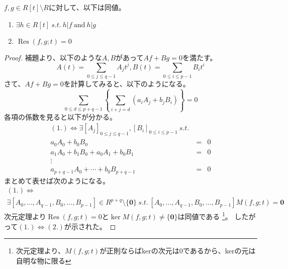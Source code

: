 \documentclass[a4]{article}
\newcommand{\Res}{\operatorname{Res}}
\begin{document}
        \begin{Them}
            $f,g \in R[t] \setminus R$に対して、以下は同値。
            \begin{enumerate}
                \item $\exists h \in R[t]~s.t.~ h|f~\mbox{and}~h|g$
                \item $\Res(f,g; t)=0$
            \end{enumerate}
        \end{Them}
        \begin{proof}
            補題より、以下のような$A,B$があって$Af+Bg=0$を満たす。
            \[ A(t)=\sum_{0 \leq j \leq q-1}{A_{j}t^{j}},B(t)=\sum_{0 \leq i \leq p-1}{B_{i}t^{i}} \]
            さて、$Af+Bg=0$を計算してみると、以下のようになる。
            \[ \sum_{0 \leq d \leq p+q-1}{ \left\{ \sum_{i+j=d}{(a_i A_j + b_j B_i)} \right\}}=0 \]
            各項の係数を見ると以下が分かる。
            \begin{eqnarray*}
            (1.) \iff
            \exists [A_j]_{0 \leq j \leq q-1}, [B_i]_{0 \leq i \leq p-1} ~s.t.~ \\
            a_0 A_0 + b_0 B_0 &=&0 \\
            a_1 A_0 + b_1 B_0+a_0 A_1 + b_0 B_1&=&0 \\
            \vdots \\
            a_{p+q-1} A_0 + \cdots + b_0 B_{p+q-1}&=&0
            \end{eqnarray*}
            まとめて表せば次のようになる。
            \begin{gather*}
                (1.) \iff \\
                \exists [A_0, \dots, A_{q-1}, B_0, \dots, B_{p-1}] \in R^{p+q} \setminus \{ \mathbf{0} \} ~s.t.~
                [A_0, \dots, A_{q-1}, B_0, \dots, B_{p-1}] M(f,g;t)=\mathbf{0}
            \end{gather*}
            次元定理より$\Res(f,g;t)=0$と$\operatorname{ker}M(f,g;t) \neq \{ \mathbf{0} \}$は同値である
            \footnote{次元定理より、$M(f,g;t)$が正則ならばkerの次元は0であるから、kerの元は自明な物に限る}。
            したがって$(1.) \iff (2.)$が示された。
            
        \end{proof}
\end{document}
